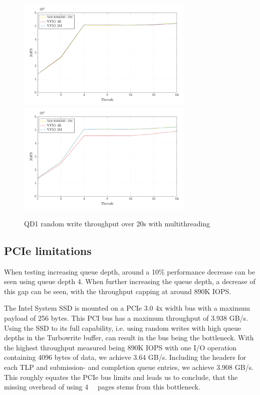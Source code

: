 \begin{figure}[H]
  \centering
   {\includegraphics[width=0.75\textwidth]{figures/qd1tn_1page}}
   {\includegraphics[width=0.75\textwidth]{figures/qd1tn_512page}}
  \caption{QD1 random write throughput over 20s with multithreading}
  \label{fig:qd1tn_4kib}
\end{figure}

\subsection{PCIe limitations}
When testing increasing queue depth, around a 10\% performance decrease can be seen using queue depth 4. When further increasing the queue depth, a decrease of this gap can be seen, with the throughput capping at around 890K IOPS.

The Intel System SSD is mounted on a PCIe 3.0 4x width bus with a maximum payload of 256 bytes. This PCI bus has a maximum throughput of 3.938 GB/s. Using the SSD to its full capability, i.e. using random writes with high queue depths in the Turbowrite buffer, can result in the bus being the bottleneck. With the highest throughput measured being 890K IOPS with one I/O operation containing 4096 bytes of data, we achieve 3.64 GB/s. Including the headers for each TLP and submission- and completion queue entries, we achieve 3.908 GB/s. This roughly equates the PCIe bus limits and leads us to conclude, that the missing overhead of using \qty{4}{\kibi\byte} pages stems from this bottleneck.

